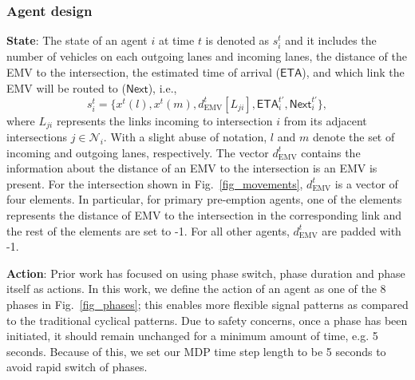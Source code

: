 \subsubsection{Agent design}
\textbf{State}: The state of an agent $i$ at time $t$ is denoted as $s^t_i$ and it includes the number of vehicles on each outgoing lanes and incoming lanes, the distance of the EMV to the intersection, the estimated time of arrival ($\mathsf{ETA}$), and which link the EMV will be routed to ($\mathsf{Next}$), i.e.,
\begin{equation}
    s^t_i = \{x^t(l), x^t(m),  d^t_{\text{EMV}}[L_{ji}], \mathsf{ETA}^{t'}_i, \mathsf{Next}^{t'}_i \},%
\end{equation}
where $L_{ji}$ represents the links incoming to intersection  $i$ from its adjacent intersections $j\in\mathcal{N}_{i}$. With a slight abuse of notation, $l$ and $m$ denote the set of incoming and outgoing lanes, respectively. The vector $d^t_{\text{EMV}}$ contains the information about the distance of an EMV to the intersection is an EMV is present. For the intersection shown in Fig.~\ref{fig_movements}, $d^t_{\text{EMV}}$ is a vector of four elements. In particular, for primary pre-emption agents, one of the elements represents the distance of EMV to the intersection in the corresponding link and the rest of the elements are set to -1. For all other agents, $d^t_{\text{EMV}}$ are padded with -1. 

\textbf{Action}: Prior work has focused on using phase switch, phase duration and phase itself as actions. In this work, we define the action of an agent as one of the 8 phases in Fig.~\ref{fig_phases}; this enables more flexible signal patterns as compared to the traditional cyclical patterns. 
Due to safety concerns, once a phase has been initiated, it should remain unchanged for a minimum amount of time, e.g. 5 seconds. Because of this, we set our MDP time step length to be 5 seconds to avoid rapid switch of phases. 

